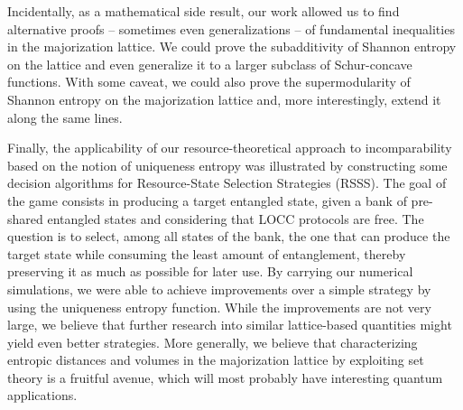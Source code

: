 Incidentally, as a mathematical side result, our work allowed us to find alternative proofs –  sometimes even generalizations – of fundamental inequalities in the majorization lattice. We could prove the subadditivity of Shannon entropy on the lattice and even generalize it to a larger subclass of Schur-concave functions. With some caveat, we could also prove the supermodularity of Shannon entropy on the majorization lattice and, more interestingly, extend it along the same lines. 

Finally, the applicability of our resource-theoretical approach to incomparability based on the notion of uniqueness entropy was illustrated by constructing some decision algorithms for Resource-State Selection Strategies (RSSS). The goal of the game consists in producing a target entangled state, given a bank of pre-shared entangled states and considering that LOCC protocols are free. The question is to select, among all states of the bank, the one that can produce the target state while consuming the least amount of entanglement, thereby preserving it as much as possible for later use.  By carrying our numerical simulations, we were able to achieve improvements over a simple strategy by using the uniqueness entropy function. While the improvements are not very large, we believe that further research into similar lattice-based quantities might yield even better strategies. More generally, we believe that characterizing entropic distances and volumes in the majorization lattice by exploiting set theory is a fruitful avenue, which will most probably have interesting quantum applications.




